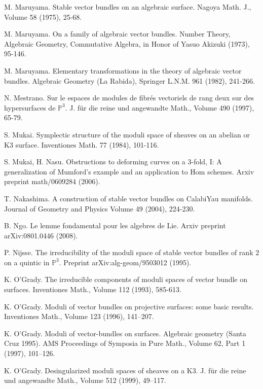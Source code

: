 \documentclass{amsart}
\theoremstyle{plain}
\numberwithin{equation}{section}
\begin{document}
\begin{thebibliography}{A}
    
M. Maruyama. Stable vector bundles on an algebraic surface. Nagoya Math. J., Volume 58 (1975), 25-68.

M. Maruyama. On a family of algebraic vector bundles.
Number Theory, Algebraic Geometry, Commutative Algebra, in Honor of Yasuo Akizuki (1973),
95-146.

M. Maruyama. Elementary transformations in the theory of algebraic vector bundles.
Algebraic Geometry (La Rabida), Springer L.N.M. 961 (1982), 241-266. 

N. Mestrano. Sur le espaces de modules de fibr\'es vectoriels de rang deux sur
des hypersurfaces de ${{\mathbb P}} ^3$. J. f\"ur die reine und angewandte Math., Volume 490 (1997),
65-79. 

S. Mukai. Symplectic structure of the moduli space of sheaves on an abelian or K3
surface. Inventiones Math. 77 (1984), 101-116. 

S. Mukai, H. Nasu. 
Obstructions to deforming curves on a 3-fold, I: A generalization of Mumford's example and 
an application to Hom schemes.
Arxiv preprint math/0609284 (2006).

T. Nakashima. 
A construction of stable vector bundles on CalabiYau manifolds.
Journal of Geometry and Physics
Volume 49 (2004), 224-230.

B. Ngo. Le lemme fondamental pour les algebres de Lie. 
Arxiv preprint arXiv:0801.0446 (2008).

P. Nijsse. The irreducibility of the moduli space of stable vector bundles of rank $2$
on a quintic in ${{\mathbb P}} ^3$. Preprint arXiv:alg-geom/9503012 (1995).

K. O'Grady. The irreducible components of moduli spaces of vector bundle on surfaces.
Inventiones Math., Volume 112 (1993), 585-613. 

K. O'Grady. Moduli of vector bundles on projective surfaces: some basic results.
Inventiones Math., Volume
123 (1996), 141--207.

K. O'Grady. Moduli of vector-bundles on surfaces.
Algebraic geometry (Santa Cruz 1995). 
AMS Proceedings of Symposia in Pure Math., Volume 62, Part 1 (1997),
101--126.

K. O'Grady. Desingularized moduli spaces of sheaves on a K3. 
J. f\"ur die reine und angewandte Math., Volume 512 (1999),
49--117.


\end{thebibliography}
\end{document}

